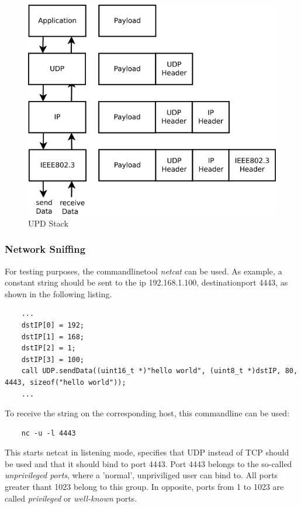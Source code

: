\begin{figure}[h]
 \centerline{\includegraphics[width=.8\columnwidth]{pics/udpstack.png}}
  \caption{UPD Stack}
  \label{fig:udpstack}
\end{figure}

\subsubsection{Network Sniffing}

For testing purposes, the commandlinetool \textit{netcat} can be used. As example, a constant string should be sent to the ip 192.168.1.100, destinationport 4443, as shown in the following listing.

\begin{lstlisting}
	...
	dstIP[0] = 192;
	dstIP[1] = 168;
	dstIP[2] = 1;
	dstIP[3] = 100;
	call UDP.sendData((uint16_t *)"hello world", (uint8_t *)dstIP, 80, 4443, sizeof("hello world"));
	...
\end{lstlisting}

To receive the string on the corresponding host, this commandline can be used:

\begin{lstlisting}
	nc -u -l 4443
\end{lstlisting}

This starts netcat in listening mode, specifies that UDP instead of TCP should be used and that it should bind to port 4443. Port 4443 belongs to the so-called \textit{unprivileged ports}, where a 'normal', unpriviliged user can bind to. All ports greater thant 1023 belong to this group. In opposite, ports from 1 to 1023 are called \textit{privileged} or \textit{well-known} ports.


